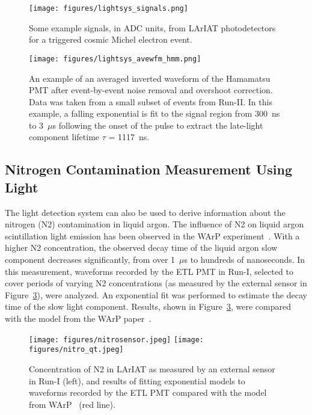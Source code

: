 \begin{figure}
\centering
\texttt{[image: figures/lightsys\_signals.png]}
\caption{Some example signals, in ADC units, from LArIAT photodetectors for a triggered cosmic Michel electron event.}
\label{lightsys_signals}
\end{figure}
\begin{figure}
\centering
\texttt{[image: figures/lightsys\_avewfm\_hmm.png]}
\caption{\label{wfm_hmmpmt}An example of an averaged inverted waveform of the Hamamatsu PMT after event-by-event noise removal and overshoot correction.  Data was taken from a small subset of events from Run-II.  In this example, a falling exponential is fit to the signal region from 300~ns to 3~$\mu$s following the onset of the pulse to extract the late-light component lifetime $\tau$ = 1117~ns.}
\end{figure}

\subsection*{Nitrogen Contamination Measurement Using Light}

The light detection system can also be used to derive information about the nitrogen (N2) contamination in liquid argon. The influence of N2 on liquid argon scintillation light emission has been observed in the WArP experiment~\cite{WARP-nitrogen}. With a higher N2 concentration, the observed decay time of the liquid argon slow component decreases significantly, from over 1~$\mu$s to hundreds of nanoseconds. In this measurement, waveforms recorded by the ETL PMT in Run-I, selected to cover periods of varying N2 concentrations (as measured by the external sensor in Figure~\ref{light_nitro}), were analyzed. An exponential fit was performed to estimate the decay time of the slow light component. Results, shown in Figure~\ref{light_nitro}, were compared with the model from the WArP paper~\cite{WARP-nitrogen}.

\begin{figure}
\texttt{[image: figures/nitrosensor.jpeg]}
\hspace{0.5cm}
\texttt{[image: figures/nitro\_qt.jpeg]}
\label{light_nitro}
\caption{Concentration of N2 in LArIAT as measured by an external sensor in Run-I (left), and results of fitting exponential models to waveforms recorded by the ETL PMT compared with the model from WArP~\cite{WARP-nitrogen} (red line).}
\end{figure}
